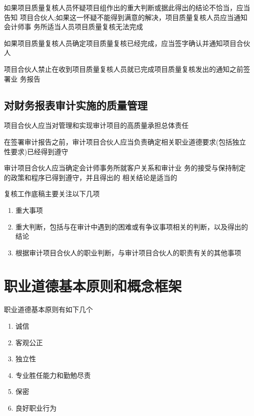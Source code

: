 \documentclass[UTF8,12pt]{ctexart}
\numberwithin{equation}{section} %
\numberwithin{figure}{section}
\numberwithin{table}{section}
\begin{document}
	如果项目质量复核人员怀疑项目组作出的重大判断或据此得出的结论不恰当，应当告知 项目合伙人;如果这一怀疑不能得到满意的解决，项目质量复核人员应当通知会计师事 务所适当人员项目质量复核无法完成 
	
	如果项目质量复核人员确定项目质量复核已经完成，应当签字确认并通知项目合伙人 
	
	项目合伙人禁止在收到项目质量复核人员就已完成项目质量复核发出的通知之前签署业 务报告
	
	\subsection{对财务报表审计实施的质量管理}
	项目合伙人应当对管理和实现审计项目的高质量承担总体责任
	
	在签署审计报告之前，审计项目合伙人应当负责确定相关职业道德要求(包括独立性要求)已经得到遵守
	
	审计项目合伙人应当确定会计师事务所就客户关系和审计业 务的接受与保持制定的政策和程序已得到遵守，并且得出的 相关结论是适当的
	
	复核工作底稿主要关注以下几项
	\begin{enumerate}
		\item 重大事项
		
		\item 重大判断，包括与在审计中遇到的困难或有争议事项相关的判断，以及得出的结论
		
		\item 根据审计项目合伙人的职业判断，与审计项目合伙人的职责有关的其他事项
	\end{enumerate}
	
	\newpage
	\section{职业道德基本原则和概念框架}
	职业道德基本原则有如下几个
	\begin{enumerate}
		\item 诚信
		
		\item 客观公正
		
		\item 独立性
		
		\item 专业胜任能力和勤勉尽责
		
		\item 保密
		
		\item 良好职业行为
	\end{enumerate}
	
\end{document}
